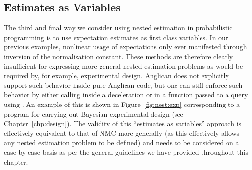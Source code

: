 \subsection{Estimates as Variables}
\label{sec:design:imp:expt}

The third and final way we consider using nested estimation in probabilistic programming
is to use expectation estimates as first class variables.  In our previous examples,
nonlinear usage of expectations only ever manifested through inversion of the normalization
constant.  These methods are therefore clearly insufficient for expressing more general
nested estimation problems as would be required by, for example, experimental design.
Anglican does not explicitly support such behavior inside pure Anglican code, but 
one can still enforce such
behavior by either calling \doquery inside a  deceleration or in a  function
passed to a query using .  An example of this is shown
in Figure~\ref{fig:nest:exp} corresponding to a program for carrying out Bayesian experimental
design (see Chapter~\ref{chp:design}).  The validity of this ``estimates as variables'' 
approach is effectively
equivalent to that of NMC more generally (as this effectively allows any nested estimation
problem to be defined) and needs to be considered on a case-by-case basis as per
the general guidelines we have provided throughout this chapter.


